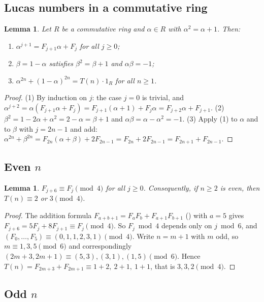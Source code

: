 \documentclass[11pt]{amsart}
\theoremstyle{plain}
\newtheorem{lemma}[theorem]{Lemma}
\theoremstyle{definition}
\begin{document}
\subsection{Lucas numbers in a commutative ring}

\begin{lemma}\label{lem:ring}
Let $R$ be a commutative ring and $\alpha\in R$ with $\alpha^2=\alpha+1$. Then:
\begin{enumerate}
\item $\alpha^{j+1}=F_{j+1}\alpha+F_j$ for all $j\ge0$;
\item $\beta=1-\alpha$ satisfies $\beta^2=\beta+1$ and $\alpha\beta=-1$;
\item $\alpha^{2n}+(1-\alpha)^{2n}=T(n)\cdot1_R$ for all $n\ge1$.
\end{enumerate}
\end{lemma}

\begin{proof}
(1) By induction on $j$: the case $j=0$ is trivial, and
$\alpha^{j+2}=\alpha(F_{j+1}\alpha+F_j)=F_{j+1}(\alpha+1)+F_j\alpha=F_{j+2}\alpha+F_{j+1}$.
(2) $\beta^2=1-2\alpha+\alpha^2=2-\alpha=\beta+1$ and $\alpha\beta=\alpha-\alpha^2=-1$.
(3) Apply (1) to $\alpha$ and to $\beta$ with $j=2n-1$ and add:
$\alpha^{2n}+\beta^{2n}=F_{2n}(\alpha+\beta)+2F_{2n-1}=F_{2n}+2F_{2n-1}=F_{2n+1}+F_{2n-1}$.
\end{proof}

\subsection{\texorpdfstring{Even $n$}{Even n}}

\begin{lemma}\label{lem:mod4}
$F_{j+6}\equiv F_j\pmod4$ for all $j\ge0$. Consequently, if $n\ge2$ is even, then $T(n)\equiv2$ or $3\pmod4$.
\end{lemma}

\begin{proof}
The addition formula $F_{a+b+1}=F_aF_b+F_{a+1}F_{b+1}$ () with $a=5$ gives $F_{j+6}=5F_j+8F_{j+1}\equiv F_j\pmod 4$.
So $F_j\bmod 4$ depends only on $j\bmod 6$, and $(F_0,\dots,F_5)\equiv(0,1,1,2,3,1)\pmod4$.
Write $n=m+1$ with $m$ odd, so $m\equiv1,3,5\pmod6$ and correspondingly $(2m+3,2m+1)\equiv(5,3),(3,1),(1,5)\pmod6$.
Hence $T(n)=F_{2m+3}+F_{2m+1}\equiv 1+2,\ 2+1,\ 1+1$, that is $3,3,2\pmod4$.
\end{proof}

\subsection{\texorpdfstring{Odd $n$}{Odd n}}
\end{document}
